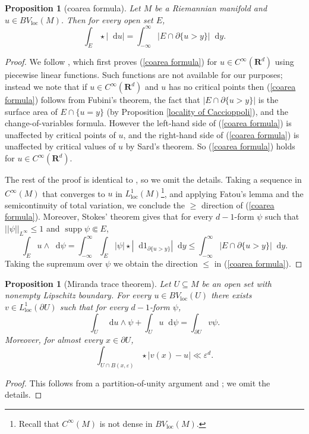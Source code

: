 \documentclass[reqno,10pt]{amsart}
\newcommand{\RR}{\mathbf{R}}
\DeclareMathOperator{\supp}{supp}
\newcommand*\dif{\mathop{}\!\mathrm{d}}
\newcommand{\loc}{\mathrm{loc}}
\newtheorem{proposition}[theorem]{Proposition}
\theoremstyle{definition}
\numberwithin{equation}{section}
\begin{document}
\begin{proposition}[coarea formula]\label{Coarea2}
Let $M$ be a Riemannian manifold and $u \in BV_\loc(M)$. Then for every open set $E$,
\begin{equation}\label{coarea formula}
\int_E \star |\dif u| = \int_{-\infty}^\infty |E \cap \partial \{u > y\}| \dif y.
\end{equation}
\end{proposition}
\begin{proof}
We follow \cite[Theorem 1.23]{Giusti77}, which first proves (\ref{coarea formula}) for $u \in C^\infty(\RR^d)$ using piecewise linear functions.
Such functions are not available for our purposes; instead we note that if $u \in C^\infty(\RR^d)$ and $u$ has no critical points then (\ref{coarea formula}) follows from Fubini's theorem, the fact that $|E \cap \partial \{u > y\}|$ is the surface area of $E \cap \{u = y\}$ (by Proposition \ref{locality of Caccioppoli}), and the change-of-variables formula.
However the left-hand side of (\ref{coarea formula}) is unaffected by critical points of $u$, and the right-hand side of (\ref{coarea formula}) is unaffected by critical values of $u$ by Sard's theorem.
So (\ref{coarea formula}) holds for $u \in C^\infty(\RR^d)$.

The rest of the proof is identical to \cite[Theorem 1.23]{Giusti77}, so we omit the details.
Taking a sequence in $C^\infty(M)$ that converges to $u$ in $L^1_\loc(M)$\footnote{Recall that $C^\infty(M)$ is not dense in $BV_\loc(M)$.}, and applying Fatou's lemma and the semicontinuity of total variation, we conclude the $\geq$ direction of (\ref{coarea formula}).
Moreover, Stokes' theorem gives that for every $d-1$-form $\psi$ such that $||\psi||_{L^\infty} \leq 1$ and $\supp \psi \Subset E$,
$$\int_E u \wedge \dif \psi = \int_{-\infty}^\infty \int_E |\psi| \star |\dif 1_{\partial \{u > y\}}| \dif y \leq \int_{-\infty}^\infty |E \cap \partial \{u > y\}| \dif y.$$
Taking the supremum over $\psi$ we obtain the direction $\leq$ in (\ref{coarea formula}).
\end{proof}

\begin{proposition}[Miranda trace theorem]\label{traces}
Let $U \subseteq M$ be an open set with nonempty Lipschitz boundary.
For every $u \in BV_\loc(U)$ there exists $v \in L^1_\loc(\partial U)$ such that for every $d-1$-form $\psi$,
\begin{equation}\label{Miranda IBP}
\int_U \dif u \wedge \psi + \int_U u \dif \psi = \int_{\partial U} v\psi.
\end{equation}
Moreover, for almost every $x \in \partial U$,
\begin{equation}\label{convergence of trace}
\int_{U \cap B(x, \varepsilon)} \star |v(x) - u| \ll \varepsilon^d.
\end{equation}
\end{proposition}
\begin{proof}
This follows from a partition-of-unity argument and \cite[Teorema 1]{Miranda67}; we omit the details.
\end{proof}
\end{document}
